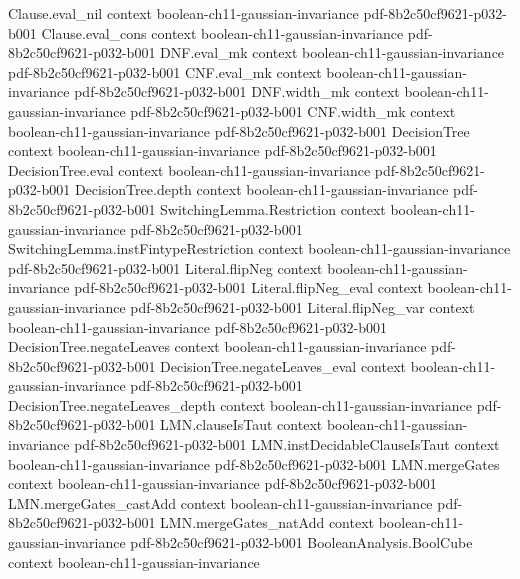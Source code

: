 \begin{lemma}
\proofstep
  {Clause.eval_nil}
  {context}
  {boolean-ch11-gaussian-invariance}
  {pdf-8b2c50cf9621-p032-b001}
\proofstep
  {Clause.eval_cons}
  {context}
  {boolean-ch11-gaussian-invariance}
  {pdf-8b2c50cf9621-p032-b001}
\proofstep
  {DNF.eval_mk}
  {context}
  {boolean-ch11-gaussian-invariance}
  {pdf-8b2c50cf9621-p032-b001}
\proofstep
  {CNF.eval_mk}
  {context}
  {boolean-ch11-gaussian-invariance}
  {pdf-8b2c50cf9621-p032-b001}
\proofstep
  {DNF.width_mk}
  {context}
  {boolean-ch11-gaussian-invariance}
  {pdf-8b2c50cf9621-p032-b001}
\proofstep
  {CNF.width_mk}
  {context}
  {boolean-ch11-gaussian-invariance}
  {pdf-8b2c50cf9621-p032-b001}
\proofstep
  {DecisionTree}
  {context}
  {boolean-ch11-gaussian-invariance}
  {pdf-8b2c50cf9621-p032-b001}
\proofstep
  {DecisionTree.eval}
  {context}
  {boolean-ch11-gaussian-invariance}
  {pdf-8b2c50cf9621-p032-b001}
\proofstep
  {DecisionTree.depth}
  {context}
  {boolean-ch11-gaussian-invariance}
  {pdf-8b2c50cf9621-p032-b001}
\proofstep
  {SwitchingLemma.Restriction}
  {context}
  {boolean-ch11-gaussian-invariance}
  {pdf-8b2c50cf9621-p032-b001}
\proofstep
  {SwitchingLemma.instFintypeRestriction}
  {context}
  {boolean-ch11-gaussian-invariance}
  {pdf-8b2c50cf9621-p032-b001}
\proofstep
  {Literal.flipNeg}
  {context}
  {boolean-ch11-gaussian-invariance}
  {pdf-8b2c50cf9621-p032-b001}
\proofstep
  {Literal.flipNeg_eval}
  {context}
  {boolean-ch11-gaussian-invariance}
  {pdf-8b2c50cf9621-p032-b001}
\proofstep
  {Literal.flipNeg_var}
  {context}
  {boolean-ch11-gaussian-invariance}
  {pdf-8b2c50cf9621-p032-b001}
\proofstep
  {DecisionTree.negateLeaves}
  {context}
  {boolean-ch11-gaussian-invariance}
  {pdf-8b2c50cf9621-p032-b001}
\proofstep
  {DecisionTree.negateLeaves_eval}
  {context}
  {boolean-ch11-gaussian-invariance}
  {pdf-8b2c50cf9621-p032-b001}
\proofstep
  {DecisionTree.negateLeaves_depth}
  {context}
  {boolean-ch11-gaussian-invariance}
  {pdf-8b2c50cf9621-p032-b001}
\proofstep
  {LMN.clauseIsTaut}
  {context}
  {boolean-ch11-gaussian-invariance}
  {pdf-8b2c50cf9621-p032-b001}
\proofstep
  {LMN.instDecidableClauseIsTaut}
  {context}
  {boolean-ch11-gaussian-invariance}
  {pdf-8b2c50cf9621-p032-b001}
\proofstep
  {LMN.mergeGates}
  {context}
  {boolean-ch11-gaussian-invariance}
  {pdf-8b2c50cf9621-p032-b001}
\proofstep
  {LMN.mergeGates_castAdd}
  {context}
  {boolean-ch11-gaussian-invariance}
  {pdf-8b2c50cf9621-p032-b001}
\proofstep
  {LMN.mergeGates_natAdd}
  {context}
  {boolean-ch11-gaussian-invariance}
  {pdf-8b2c50cf9621-p032-b001}
\proofstep
  {BooleanAnalysis.BoolCube}
  {context}
  {boolean-ch11-gaussian-invariance}

\end{lemma}
